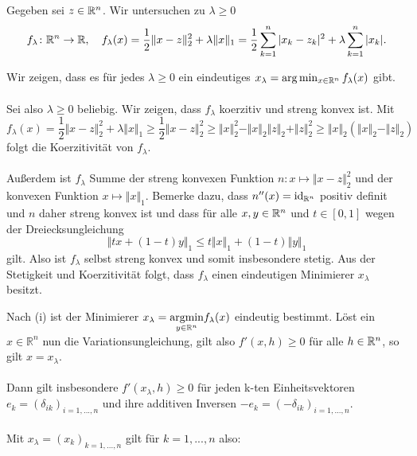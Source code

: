 
Gegeben sei $z\in\mathbb{R}^n$. Wir untersuchen zu $\lambda\geq 0$
\begin{displaymath}
 f_\lambda\colon \mathbb{R}^n\to\mathbb{R},\quad f_\lambda(x)=\frac{1}{2}\Vert x-z\Vert_2^2+\lambda\Vert x\Vert_1=\frac{1}{2}\sum_{k=1}^n |x_k-z_k|^2+\lambda\sum_{k=1}^n|x_k|.
\end{displaymath}
\begin{compactenum}[(i)]
 \item Wir zeigen, dass es für jedes $\lambda\geq 0$ ein eindeutiges $x_\lambda = \arg\min_{x\in\mathbb{R}^n}f_\lambda(x)$ gibt.\\\\
Sei also $\lambda\geq 0$ beliebig.
 Wir zeigen, dass $f_\lambda$ koerzitiv und streng konvex ist. Mit
 \begin{displaymath}
  f_\lambda(x)=\frac{1}{2}\Vert x-z\Vert_2^2+\lambda\Vert x\Vert_1\geq \frac{1}{2}\Vert x-z\Vert_2^2\geq \Vert x\Vert_2^2-\Vert x\Vert_2\Vert z\Vert_2+\Vert z \Vert_2^2\geq \Vert x\Vert_2(\Vert x\Vert_2-\Vert z\Vert_2)
 \end{displaymath}
 folgt die Koerzitivität von $f_\lambda$.\\\\
Außerdem ist $f_\lambda$ Summe der streng konvexen Funktion $n: x\mapsto \Vert x-z\Vert_2^2$ und der konvexen Funktion $x\mapsto \Vert x\Vert_1$. Bemerke dazu, dass $n''(x)=\operatorname{id}_{\mathbb{R}^n}$ positiv definit und $n$ daher streng konvex ist und dass für alle $x,y\in\mathbb{R}^n$ und $t\in [0,1]$
wegen der Dreiecksungleichung
 \begin{displaymath}
  \Vert tx+(1-t)y\Vert_1\leq t\Vert x\Vert_1+(1-t)\Vert y\Vert_1
 \end{displaymath}
gilt. Also ist $f_\lambda$ selbst streng konvex und somit insbesondere stetig. Aus der Stetigkeit und Koerzitivität folgt, dass $f_\lambda$ einen eindeutigen Minimierer $x_\lambda$ besitzt.
\item Nach (i) ist der Minimierer $x_\lambda=\underset{y\in\mathbb{R}^n}{\text{argmin}} f_\lambda(x)$ eindeutig bestimmt.
Löst ein $x\in\mathbb R^n$ nun die Variationsungleichung, gilt also $f'(x,h)\geq 0$ für alle $h\in\mathbb{R}^n$, so gilt $x=x_\lambda$.\\\\
Dann gilt insbesondere $f'(x_\lambda,h)\geq 0$ für jeden k-ten Einheitsvektoren $e_k=(\delta_{ik})_{i=1,...,n}$ und ihre additiven Inversen $-e_k=(-\delta_{ik})_{i=1,...,n}$.\\\\
Mit $x_\lambda=(x_k)_{k=1,...,n}$ gilt für $k=1,...,n$ also:

\end{compactenum}
